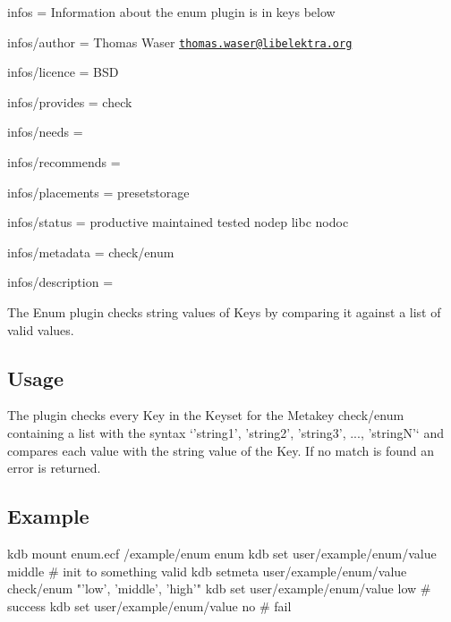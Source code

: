 
\begin{DoxyItemize}
\item infos = Information about the enum plugin is in keys below
\item infos/author = Thomas Waser \href{mailto:thomas.waser@libelektra.org}{\tt thomas.\+waser@libelektra.\+org}
\item infos/licence = B\+S\+D
\item infos/provides = check
\item infos/needs =
\item infos/recommends =
\item infos/placements = presetstorage
\item infos/status = productive maintained tested nodep libc nodoc
\item infos/metadata = check/enum
\item infos/description =
\end{DoxyItemize}

The Enum plugin checks string values of Keys by comparing it against a list of valid values.

\subsection*{Usage}

The plugin checks every Key in the Keyset for the Metakey {\ttfamily check/enum} containing a list with the syntax `'string1', 'string2', 'string3', ..., 'string\+N'` and compares each value with the string value of the Key. If no match is found an error is returned.

\subsection*{Example}

\begin{DoxyVerb}    kdb mount enum.ecf /example/enum enum
    kdb set user/example/enum/value middle # init to something valid
    kdb setmeta user/example/enum/value check/enum "'low', 'middle', 'high'"
    kdb set user/example/enum/value low # success
    kdb set user/example/enum/value no  # fail\end{DoxyVerb}
 
